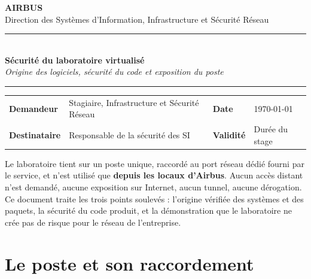 \documentclass[11pt,a4paper]{article}
\begin{document}
\begin{center}
{\sffamily\Large\bfseries\color{primary} AIRBUS}\\[2pt]
{\sffamily\footnotesize\color{gris} Direction des Systèmes d'Information, Infrastructure et Sécurité Réseau}

\vspace{9pt}
\noindent\textcolor{primary}{\rule{\textwidth}{2.5pt}}\\[9pt]
{\sffamily\LARGE\bfseries\color{primary} Sécurité du laboratoire virtualisé}\\[7pt]
{\sffamily\normalsize\itshape\color{gris} Origine des logiciels, sécurité du code et exposition du poste}\\[7pt]
\noindent\textcolor{accent}{\rule{\textwidth}{1pt}}
\end{center}

\vspace{2pt}
\begin{center}\small
\begin{tabularx}{0.94\textwidth}{@{}L{2.6cm}L{6.4cm}L{2.0cm}Y@{}}
\textbf{Demandeur} & Stagiaire, Infrastructure et Sécurité Réseau & \textbf{Date} & \today \\
\textbf{Destinataire} & Responsable de la sécurité des SI & \textbf{Validité} & Durée du stage \\
\end{tabularx}
\end{center}

\vspace{2pt}

\begin{notebox}
Le laboratoire tient sur un poste unique, raccordé au port réseau dédié fourni
par le service, et n'est utilisé que \textbf{depuis les locaux d'Airbus}. Aucun
accès distant n'est demandé, aucune exposition sur Internet, aucun tunnel, aucune
dérogation. Ce document traite les trois points soulevés : l'origine vérifiée des
systèmes et des paquets, la sécurité du code produit, et la démonstration que le
laboratoire ne crée pas de risque pour le réseau de l'entreprise.
\end{notebox}

\section{Le poste et son raccordement}
\end{document}
